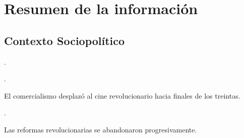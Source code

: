 \section{Resumen de la información}
\subsection{Contexto Sociopolítico}
\begin{compactitem}
\item 
{}
\autocite[10]{garcia_riera_historia_1992}. 
\item  
{}
\autocite[365-366]{sanchez_vi._2010}.
\item El comercialismo desplazó al cine revolucionario hacia finales de los treintas\autocite[439]{cosio_villegas_notas_1976}.
\item 
{}
\autocite[440]{cosio_villegas_notas_1976}.
\item Las reformas revolucionarias se abandonaron progresivamente. \autocite[62]{consuelo_rangel_ley_2006}

\end{compactitem}
